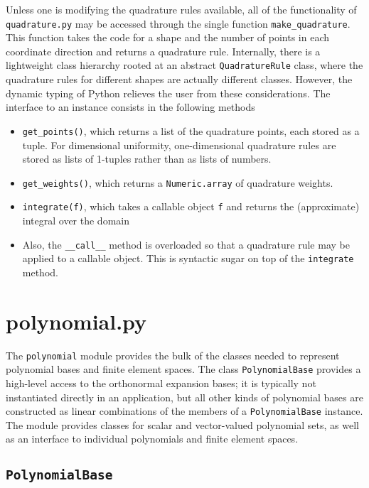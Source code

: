 \documentclass{fenicsmanual}
\begin{document}
Unless one is modifying the quadrature rules available, all of the
functionality of \texttt{quadrature.py} may be accessed through the
single function \verb.make_quadrature..
This function takes the code for a shape and the number of points in
each coordinate direction and returns a quadrature rule.  Internally,
there is a lightweight class hierarchy rooted at an abstract
\texttt{QuadratureRule} class, where the quadrature rules for
different shapes are actually different classes.  However, the dynamic
typing of Python relieves the user from these considerations.  The
interface to an instance consists in the following methods
\begin{itemize}
\item \verb.get_points()., which returns a list of the quadrature
  points, each stored as a tuple.  For dimensional uniformity,
  one-dimensional quadrature rules are stored as lists of 1-tuples
  rather than as lists of numbers.
\item \verb.get_weights()., which returns a \texttt{Numeric.array}
  of quadrature weights.
\item \verb.integrate(f)., which takes a callable object \texttt{f}
  and returns the (approximate) integral over the domain
\item Also, the \verb.__call__. method is overloaded so that a
  quadrature rule may be applied to a callable object.  This is
  syntactic sugar on top of the \texttt{integrate} method.
\end{itemize}

\section{polynomial.py}
The \texttt{polynomial} module provides the bulk of the classes
needed to represent polynomial bases and finite element spaces.
The class \texttt{PolynomialBase} provides a high-level access to
the orthonormal expansion bases; it is typically not instantiated
directly in an application, but all other kinds of polynomial bases
are constructed as linear combinations of the members of a
\texttt{PolynomialBase} instance.  The module provides classes for
scalar and vector-valued polynomial sets, as well as an interface to individual
polynomials and finite element spaces.

\subsection{\texttt{PolynomialBase}}
\end{document}
